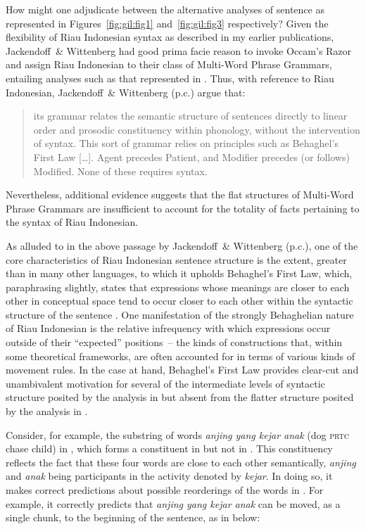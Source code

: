 \documentclass[output=paper]{langscibook}
\begin{document}
How might one adjudicate between the alternative analyses of sentence  as represented in Figures~\ref{fig:gil:fig1} and~\ref{fig:gil:fig3} respectively?  Given the flexibility of Riau Indonesian syntax as described in my earlier publications, Jackendoff~\& Wittenberg had good prima facie reason to invoke Occam's Razor and assign Riau Indonesian to their class of Multi-Word Phrase Grammars, entailing analyses such as that represented in .  Thus, with reference to Riau Indonesian, Jackendoff~\& Wittenberg (p.c.) argue that:

\begin{quote}
      its grammar relates the semantic structure of sentences directly to linear order and
     prosodic constituency within phonology, without the intervention of syntax.  This sort of
     grammar relies on principles such as Behaghel’s First Law  [\ldots]. Agent precedes Patient, and
     Modifier precedes (or follows) Modified.  None of these requires syntax.
\end{quote}

Nevertheless, additional evidence suggests that the flat structures of Multi-Word Phrase Grammars are insufficient to account for the totality of facts pertaining to the syntax of Riau Indonesian.

As alluded to in the above passage by Jackendoff~\& Wittenberg (p.c.), one of the core characteristics of Riau Indonesian sentence structure is the extent, greater than in many other languages, to which it upholds Behaghel's First Law, which, paraphrasing slightly, states that expressions whose meanings are closer to each other in conceptual space tend to occur closer to each other within the syntactic structure of the sentence \citep{behaghel1932deutsche}.  One manifestation of the strongly Behaghelian nature of Riau Indonesian is the relative infrequency with which expressions occur outside of their ``expected'' positions~– the kinds of constructions that, within some theoretical frameworks, are often accounted for in terms of various kinds of movement rules.  In the case at hand, Behaghel's First Law provides clear-cut and unambivalent motivation for several of the intermediate levels of syntactic structure posited by the analysis in  but absent from the flatter structure posited by the analysis in .

Consider, for example, the substring of words \textit{anjing yang kejar anak} (dog \textsc{prtc} chase child) in , which forms a constituent in  but not in .  This constituency reflects the fact that these four words are close to each other semantically, \textit{anjing} and \textit{anak} being participants in the activity denoted by \textit{kejar}.  In doing so, it makes correct predictions about possible reorderings of the words in .  For example, it correctly predicts that \textit{anjing yang kejar anak} can be moved, as a single chunk, to the beginning of the sentence, as in  below:
\end{document}
